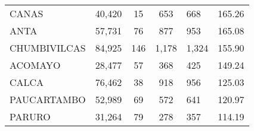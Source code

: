 \begin{tabular}{lrcclr}
	\cellcolor[HTML]{FFFF99}CANAS                                  & 40,420                                                         & 15                                                         & 653                  & 668                                                                 & 165.26                                                                       \\
	\cellcolor[HTML]{FFFF99}ANTA                                   & 57,731                                                         & 76                                                         & 877                  & 953                                                                 & 165.08                                                                       \\
	\cellcolor[HTML]{C6E0B4}CHUMBIVILCAS                           & 84,925                                                         & 146                                                        & 1,178                & 1,324                                                               & 155.90                                                                       \\
	\cellcolor[HTML]{C6E0B4}ACOMAYO                                & 28,477                                                         & 57                                                         & 368                  & 425                                                                 & 149.24                                                                       \\
	\cellcolor[HTML]{C6E0B4}CALCA                                  & 76,462                                                         & 38                                                         & 918                  & 956                                                                 & 125.03                                                                       \\
	\cellcolor[HTML]{C6E0B4}PAUCARTAMBO                            & 52,989                                                         & 69                                                         & 572                  & 641                                                                 & 120.97                                                                       \\
	\cellcolor[HTML]{C6E0B4}PARURO                                 & 31,264                                                         & 79                                                         & 278                  & 357                                                                 & 114.19                                                                       \\

\end{tabular}
